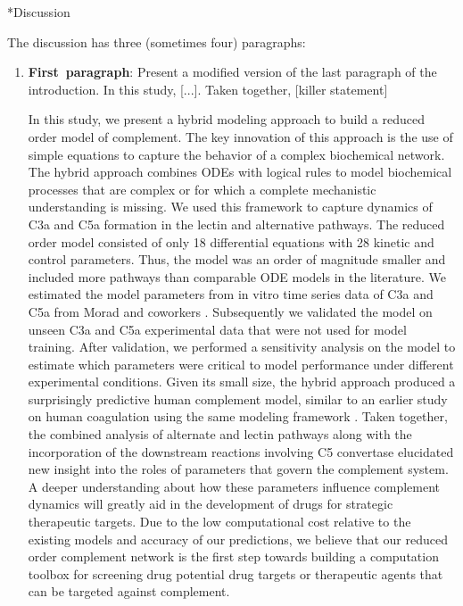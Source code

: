 \documentclass[12pt]{article}
\makeatletter
\renewcommand\section{\@startsection
	{subsection}{2}{0mm}
	{-0.2in}
	{0.05\baselineskip}
	{\normalfont\large\bfseries}}
\makeatother
\begin{document}
%

\section*{Discussion}

The discussion has three (sometimes four) paragraphs:
\begin{enumerate}
	\item{\textbf{First~paragraph}: Present a modified version of the last paragraph of the introduction. In this study, [...]. Taken together, [killer statement]}
	
	In this study, we present a hybrid modeling approach to build a reduced order model of complement. The key innovation of this approach is the use of simple equations to capture the behavior of a complex biochemical network. The hybrid approach combines ODEs with logical rules to model biochemical processes that are complex or for which a complete mechanistic understanding is missing. We used this framework to capture dynamics of C3a and C5a formation in the lectin and alternative pathways. The reduced order model consisted of only 18 differential equations with 28 kinetic and control parameters. Thus, the model was an order  of magnitude smaller and included more pathways than comparable ODE models in the literature. We estimated the model parameters from in vitro time series data of C3a and C5a from Morad and coworkers \cite{morad2015time}. Subsequently we validated the model on unseen C3a and C5a experimental data that were not used for model training.  After validation, we performed a sensitivity analysis on the model to estimate which parameters were critical to model performance under different experimental conditions. Given its small size, the hybrid approach produced a surprisingly predictive human complement model, similar to an earlier study on human coagulation using the same modeling framework \cite{sagar2015dynamic}. Taken together, the combined analysis of alternate and lectin pathways along with the incorporation of the downstream reactions involving C5 convertase elucidated new insight into the roles of parameters that govern the complement system.  A deeper understanding about how these parameters influence complement dynamics will greatly aid in the development of drugs for strategic therapeutic targets. Due to the low computational cost relative to the existing models and accuracy of our predictions, we believe that our reduced order complement network is the first step towards building a computation toolbox for screening drug potential drug targets or therapeutic agents that can be targeted against complement.


\end{enumerate}
\end{document}
